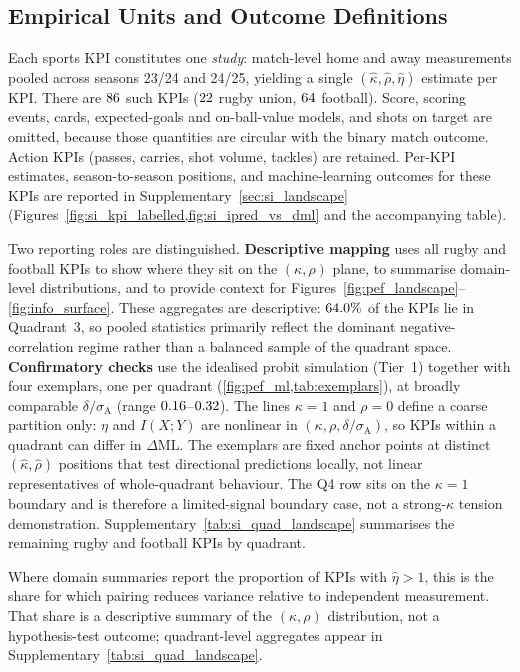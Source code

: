\subsection{Empirical Units and Outcome Definitions}
\label{sec:outcome_defs}

Each sports KPI constitutes one \emph{study}: match-level home and away measurements pooled across seasons 23/24 and 24/25, yielding a single $(\hat\kappa,\hat\rho,\hat\eta)$ estimate per KPI. There are $86{}$ such KPIs ($22{}$ rugby union, $64{}$ football). Score, scoring events, cards, expected-goals and on-ball-value models, and shots on target are omitted, because those quantities are circular with the binary match outcome. Action KPIs (passes, carries, shot volume, tackles) are retained. Per-KPI estimates, season-to-season positions, and machine-learning outcomes for these KPIs are reported in Supplementary~\cref{sec:si_landscape} (Figures~\cref{fig:si_kpi_labelled,fig:si_ipred_vs_dml} and the accompanying table).

Two reporting roles are distinguished. \textbf{Descriptive mapping} uses all rugby and football KPIs to show where they sit on the $(\kappa,\rho)$ plane, to summarise domain-level distributions, and to provide context for Figures~\ref{fig:pef_landscape}--\ref{fig:info_surface}. These aggregates are descriptive: $64.0\%$ of the KPIs lie in Quadrant~3, so pooled statistics primarily reflect the dominant negative-correlation regime rather than a balanced sample of the quadrant space. \textbf{Confirmatory checks} use the idealised probit simulation (Tier~1) together with four exemplars, one per quadrant (\cref{fig:pef_ml,tab:exemplars}), at broadly comparable $\delta/\sigma_{\mathrm{A}}$ (range $0.16$--$0.32$). The lines $\kappa=1$ and $\rho=0$ define a coarse partition only: $\eta$ and $I(X;Y)$ are nonlinear in $(\kappa,\rho,\delta/\sigma_{\mathrm{A}})$, so KPIs within a quadrant can differ in $\Delta\mathrm{ML}$. The exemplars are fixed anchor points at distinct $(\hat\kappa,\hat\rho)$ positions that test directional predictions locally, not linear representatives of whole-quadrant behaviour. The Q4 row sits on the $\kappa=1$ boundary and is therefore a limited-signal boundary case, not a strong-$\kappa$ tension demonstration. Supplementary~\cref{tab:si_quad_landscape} summarises the remaining rugby and football KPIs by quadrant.

Where domain summaries report the proportion of KPIs with $\hat\eta>1$, this is the share for which pairing reduces variance relative to independent measurement. That share is a descriptive summary of the $(\kappa,\rho)$ distribution, not a hypothesis-test outcome; quadrant-level aggregates appear in Supplementary~\cref{tab:si_quad_landscape}.

